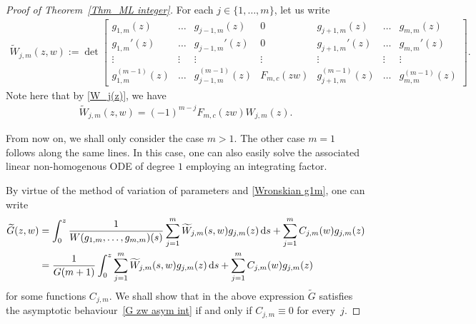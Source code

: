 \begin{proof}[Proof of Theorem~\ref{Thm_ML integer}]
	For each $j \in \{1,\dots, m\}$, let us write
	\begin{gather*}
		\widetilde{W}_{j,m}(z,w):=\det
		\begin{bmatrix}
			g_{1,m}(z) & \dots & g_{j-1,m}(z) & 0 & g_{j+1,m}(z) & \dots & g_{m,m}(z)
			\\
			g_{1,m}'(z) & \dots & g_{j-1,m}'(z) & 0 & g_{j+1,m}'(z) & \dots & g_{m,m}'(z)
			\\
			\vdots & \vdots & \vdots & \vdots & \vdots & \vdots & \vdots
			\\
			g_{1,m}^{(m-1)}(z) & \dots & g_{j-1,m}^{(m-1)}(z) & F_{m,c}(zw) & g_{j+1,m}^{(m-1)}(z) & \dots & g_{m,m}^{(m-1)}(z)
		\end{bmatrix}.
	\end{gather*}
	Note here that by \eqref{W_j(z)}, we have
	\begin{gather} \label{Wj zw F Wj}
		\widetilde{W}_{j,m}(z,w)=(-1)^{m-j} F_{m,c}(zw) W_{j,m}(z).
	\end{gather}
	
	From now on, we shall only consider the case $m>1$. The other case $m=1$ follows along the same lines. In this case, one can also easily solve the associated linear non-homogenous ODE of degree $1$ employing an integrating factor.
	
	By virtue of the method of variation of parameters and \eqref{Wronskian g1m}, one can write
	\begin{align*}
			\widetilde{G}(z,w)&= \int_0^z \frac{1}{W(g_{1,m},\dots,g_{m,m})(s)}\sum_{j=1}^{m} 	\widetilde{W}_{j,m}(s,w) g_{j,m}(z)\,{\rm d}s+ \sum_{j=1}^{m} C_{j,m}(w) g_{j,m}(z)
			\\
			&=\frac{1}{G(m+1)}\int_0^z \sum_{j=1}^{m} 	\widetilde{W}_{j,m}(s,w) g_{j,m}(z)\,{\rm d}s+ \sum_{j=1}^{m} C_{j,m}(w) g_{j,m}(z)
	\end{align*}
	for some functions $C_{j,m}$. We shall show that in the above expression $\widetilde{G}$ satisfies the asymptotic behaviour~\eqref{G zw asym int} if and only if $C_{j,m} \equiv 0$ for every~$j$.
	

\end{proof}
